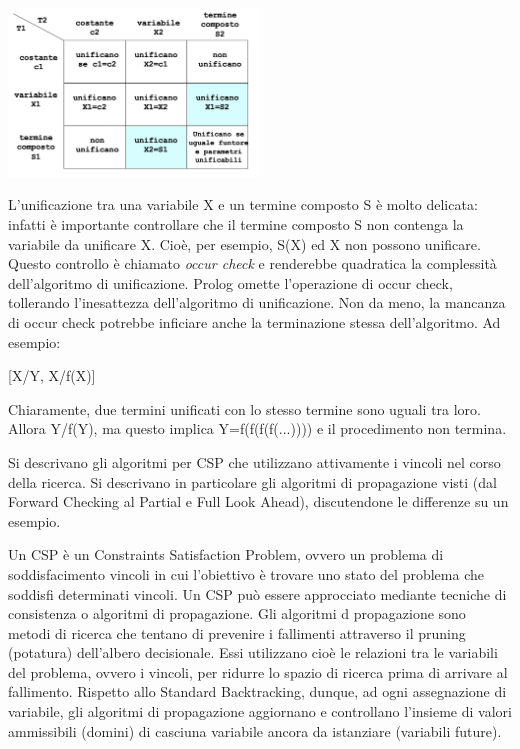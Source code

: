\documentclass[answers, a4paper, 11pt]{exam}
\begin{document}
\begin{questions}
\begin{solution}
  \begin{center}
    \includegraphics[width=0.5\textwidth]{AlgoritmoUnificazione.png}
  \end{center}

  L'unificazione tra una variabile X e un termine composto S è molto delicata: infatti è importante controllare che il termine composto S non contenga la variabile da unificare X. Cioè, per esempio, S(X) ed X non possono unificare.
  Questo controllo è chiamato \emph{occur check} e renderebbe quadratica la complessità dell'algoritmo di unificazione. Prolog omette l'operazione di occur check, tollerando l'inesattezza dell'algoritmo di unificazione. 
  Non da meno, la mancanza di occur check potrebbe inficiare anche la terminazione stessa dell'algoritmo. Ad esempio:

  [X/Y, X/f(X)]

  Chiaramente, due termini unificati con lo stesso termine sono uguali tra loro. Allora Y/f(Y), ma questo implica Y=f(f(f(f(...)))) e il procedimento non termina.

\end{solution}

\question Si descrivano gli algoritmi per CSP che utilizzano attivamente i vincoli nel corso della ricerca. Si descrivano in particolare gli algoritmi di propagazione visti (dal Forward Checking al Partial e Full Look Ahead), discutendone le differenze su un esempio.
\begin{solution}
Un CSP è un Constraints Satisfaction Problem, ovvero un problema di soddisfacimento vincoli in cui l'obiettivo è trovare uno stato del problema che soddisfi determinati vincoli.
Un CSP può essere approcciato mediante tecniche di consistenza o algoritmi di propagazione. Gli algoritmi d propagazione sono metodi di ricerca che tentano di prevenire i fallimenti attraverso il pruning (potatura) dell'albero decisionale. Essi utilizzano cioè le relazioni tra le variabili del problema, ovvero i vincoli, per ridurre lo spazio 
di ricerca prima di arrivare al fallimento. Rispetto allo Standard Backtracking, dunque, ad ogni assegnazione di variabile, gli algoritmi di propagazione aggiornano e controllano l'insieme di valori ammissibili (domini) di casciuna variabile ancora da istanziare (variabili future).


\end{solution}
\end{questions}
\end{document}
